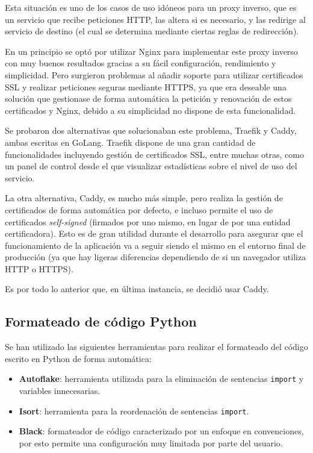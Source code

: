 Esta situación es uno de los casos de uso idóneos para un proxy inverso, que es
un servicio que recibe peticiones HTTP, las altera si es necesario, y las
redirige al servicio de destino (el cual se determina mediante ciertas reglas de
redirección).

En un principio se optó por utilizar Nginx para implementar este proxy inverso
con muy buenos resultados gracias a su fácil configuración, rendimiento y
simplicidad. Pero surgieron problemas al añadir soporte para utilizar
certificados SSL y realizar peticiones seguras mediante HTTPS, ya que era
deseable una solución que gestionase de forma automática la petición y
renovación de estos certificados y Nginx, debido a su simplicidad no dispone de
esta funcionalidad.

Se probaron dos alternativas que solucionaban este problema, Traefik y Caddy,
ambas escritas en GoLang. Traefik dispone de una gran cantidad de
funcionalidades incluyendo gestión de certificados SSL, entre muchas otras, como
un panel de control desde el que visualizar estadísticas sobre el nivel de uso
del servicio.

La otra alternativa, Caddy, es mucho más simple, pero realiza la gestión de
certificados de forma automática por defecto, e incluso permite el uso de
certificados \textit{self-signed} (firmados por uno mismo, en lugar de por una
entidad certificadora). Esto es de gran utilidad durante el desarrollo para
asegurar que el funcionamiento de la aplicación va a seguir siendo el mismo en
el entorno final de producción (ya que hay ligeras diferencias dependiendo de si
un navegador utiliza HTTP o HTTPS).

Es por todo lo anterior que, en última instancia, se decidió usar Caddy.

\subsection{Formateado de código Python}

Se han utilizado las siguientes herramientas para realizar el formateado del
código escrito en Python de forma automática:

\begin{itemize}
      \item \textbf{Autoflake}: herramienta utilizada para la eliminación de
            sentencias \texttt{import} y variables innecesarias.
      \item \textbf{Isort}: herramienta para la reordenación de sentencias
            \texttt{import}.
      \item \textbf{Black}: formateador de código caracterizado por un enfoque
            en convenciones, por esto permite una configuración muy limitada por
            parte del usuario.
\end{itemize}

